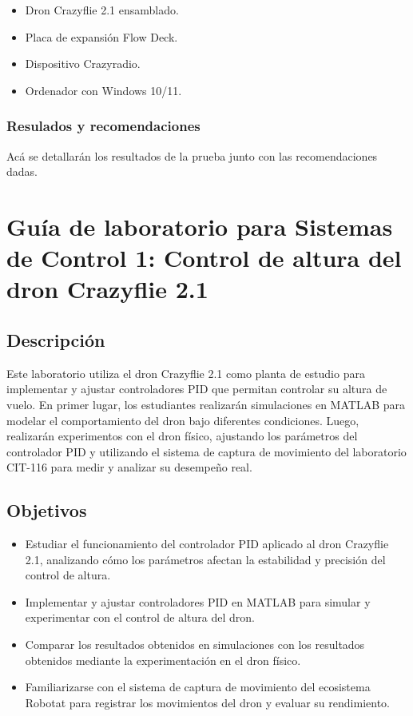 \begin{itemize}
	\item Dron Crazyflie 2.1 ensamblado.
	\item Placa de expansión Flow Deck.
	\item Dispositivo Crazyradio.
	\item Ordenador con Windows 10/11.
\end{itemize}

\subsubsection{Resulados y recomendaciones}
Acá se detallarán los resultados de la prueba junto con las recomendaciones dadas. 

\newpage
\section{Guía de laboratorio para Sistemas de Control 1: Control de altura del dron Crazyflie 2.1}
\subsection{Descripción}
Este laboratorio utiliza el dron Crazyflie 2.1 como planta de estudio para implementar y ajustar controladores PID que permitan controlar su altura de vuelo. En primer lugar, los estudiantes realizarán simulaciones en MATLAB para modelar el comportamiento del dron bajo diferentes condiciones. Luego, realizarán experimentos con el dron físico, ajustando los parámetros del controlador PID y utilizando el sistema de captura de movimiento del laboratorio CIT-116 para medir y analizar su desempeño real.

\subsection{Objetivos}
\begin{itemize}
	\item Estudiar el funcionamiento del controlador PID aplicado al dron Crazyflie 2.1, analizando cómo los parámetros afectan la estabilidad y precisión del control de altura.
	\item Implementar y ajustar controladores PID en MATLAB para simular y experimentar con el control de altura del dron.
	\item Comparar los resultados obtenidos en simulaciones con los resultados obtenidos mediante la experimentación en el dron físico.
	\item Familiarizarse con el sistema de captura de movimiento del ecosistema Robotat para registrar los movimientos del dron y evaluar su rendimiento.
\end{itemize}

